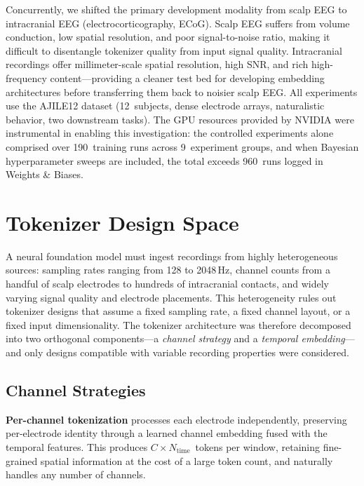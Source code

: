 \documentclass[11pt, a4paper]{article}
\begin{document}
Concurrently, we shifted the primary development modality from scalp EEG to intracranial EEG (electrocorticography, ECoG).  Scalp EEG suffers from volume conduction, low spatial resolution, and poor signal-to-noise ratio, making it difficult to disentangle tokenizer quality from input signal quality.  Intracranial recordings offer millimeter-scale spatial resolution, high SNR, and rich high-frequency content---providing a cleaner test bed for developing embedding architectures before transferring them back to noisier scalp EEG.  All experiments use the AJILE12 dataset (12~subjects, dense electrode arrays, naturalistic behavior, two downstream tasks).  The GPU resources provided by NVIDIA were instrumental in enabling this investigation: the controlled experiments alone comprised over 190~training runs across 9~experiment groups, and when Bayesian hyperparameter sweeps are included, the total exceeds 960~runs logged in Weights \& Biases.


\section{Tokenizer Design Space}
\label{sec:design-space}

A neural foundation model must ingest recordings from highly heterogeneous sources: sampling rates ranging from 128 to 2048\,Hz, channel counts from a handful of scalp electrodes to hundreds of intracranial contacts, and widely varying signal quality and electrode placements.  This heterogeneity rules out tokenizer designs that assume a fixed sampling rate, a fixed channel layout, or a fixed input dimensionality.  The tokenizer architecture was therefore decomposed into two orthogonal components---a \emph{channel strategy} and a \emph{temporal embedding}---and only designs compatible with variable recording properties were considered.

\subsection{Channel Strategies}

\textbf{Per-channel tokenization} processes each electrode independently, preserving per-electrode identity through a learned channel embedding fused with the temporal features.  This produces $C \times N_\text{time}$~tokens per window, retaining fine-grained spatial information at the cost of a large token count, and naturally handles any number of channels.
\end{document}
